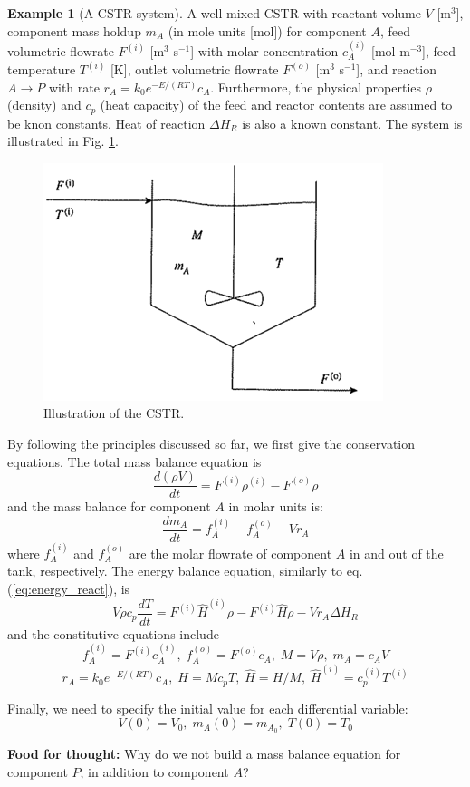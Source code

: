 \documentclass[a4paper,11pt]{article}
\theoremstyle{definition}
\newtheorem{exmp}{Example}[section]
\begin{document}
\begin{exmp}[A CSTR system]
A well-mixed CSTR with reactant volume $V$ [m$^3$], component mass holdup $m_A$ (in mole units [mol])
for component $A$, feed volumetric flowrate $F^{(i)}$ [m$^3$ s$^{-1}$] with molar concentration
$c_A^{(i)}$ [mol m$^{-3}$], feed temperature $T^{(i)}$ [K], outlet volumetric flowrate 
$F^{(o)}$ [m$^3$ s$^{-1}$], and reaction $A \to P$ with rate
$r_A = k_0 e^{-E/(RT)} c_A$. Furthermore, the physical properties $\rho$ (density) and
$c_p$ (heat capacity) of the feed and reactor contents are assumed to be knon constants.
Heat of reaction $\Delta H_R$ is also a known constant. The system is illustrated in Fig. \ref{fig:cstr}.
\begin{figure}[!h]
 \begin{center}
	\includegraphics[width=.5\textwidth]{cstr}
 \end{center}
 \caption{Illustration of the CSTR.} 
 \label{fig:cstr}
\end{figure}

By following the principles discussed so far, we first give the conservation equations.
The total mass balance equation is
\[
	\frac{d (\rho V)}{d t} = F^{(i)} \rho^{(i)} - F^{(o)} \rho
\]
and the mass balance for component $A$ in molar units is:
\[
	\frac{d m_A}{d t} = f_A^{(i)} - f_A^{(o)} - V r_A
\]
\noindent where $f_A^{(i)}$ and $f_A^{(o)}$ are the molar flowrate of component $A$ in and out of the tank, respectively.
The energy balance equation, similarly to eq. (\ref{eq:energy_react}), is 
\[
	V \rho c_p \frac{d T}{d t} = F^{(i)} \hat{H}^{(i)} \rho - F^{(i)} \hat{H} \rho - V r_A \Delta H_R
\]
\noindent and the constitutive equations include
\[	f_A^{(i)} = F^{(i)} c_A^{(i)}, \; f_A^{(o)} = F^{(o)} c_A, \; M = V \rho, \; m_A = c_A V \]
\[	r_A = k_0 e^{-E/(RT)} c_A, \; H = M c_p T, \; \hat{H} = H / M, \; \hat{H}^{(i)} = c_p^{(i)} T^{(i)} \]

Finally, we need to specify the initial value for each differential variable:
\[  V(0) = V_0, \; m_A(0) = m_{A_0}, \; T(0) = T_0 \]

\textbf{Food for thought:} Why do we not build a mass balance equation for component $P$, in addition to component $A$?
\end{exmp}
\end{document}
